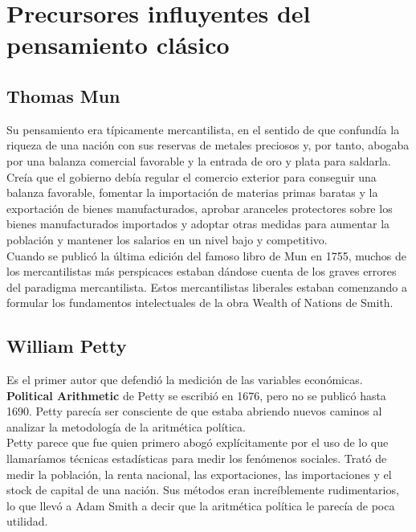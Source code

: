 \documentclass[10pt]{book}
\begin{document}
\section*{Precursores influyentes del pensamiento clásico}
\subsection*{Thomas Mun}
Su pensamiento era típicamente mercantilista, en el sentido de que confundía la riqueza de una nación con sus reservas de metales preciosos y, por tanto, abogaba por una balanza comercial favorable y la entrada de oro y plata para saldarla. Creía que el gobierno debía regular el comercio exterior para conseguir una balanza favorable, fomentar la importación de materias primas baratas y la exportación de bienes manufacturados, aprobar aranceles protectores sobre los bienes manufacturados importados y adoptar otras medidas para aumentar la población y mantener los salarios en un nivel bajo y competitivo.\\
Cuando se publicó la última edición del famoso libro de Mun en 1755, muchos de los mercantilistas más perspicaces estaban dándose cuenta de los graves errores del paradigma mercantilista. Estos mercantilistas liberales estaban comenzando a formular los fundamentos intelectuales de la obra Wealth of Nations de Smith.

\subsection*{William Petty}
Es el primer autor que defendió la medición de las variables económicas. \\
\textbf{Political Arithmetic} de Petty se escribió en 1676, pero no se publicó hasta 1690. Petty parecía ser consciente de que estaba abriendo nuevos caminos al analizar la metodología de la aritmética política.\\
Petty parece que fue quien primero abogó explícitamente por el uso de lo que llamaríamos técnicas estadísticas para medir los fenómenos sociales. Trató de medir la población, la renta nacional, las exportaciones, las importaciones y el stock de capital de una nación. Sus métodos eran increíblemente rudimentarios, lo que llevó a Adam Smith a decir que la aritmética política le parecía de poca utilidad.\\
\end{document}
